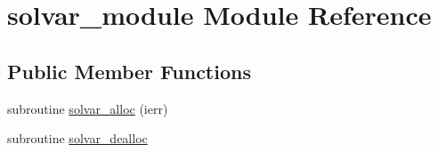 \hypertarget{classsolvar__module}{\section{solvar\-\_\-module Module Reference}
\label{classsolvar__module}
}
\subsection*{Public Member Functions}
\begin{DoxyCompactItemize}
\item 
subroutine \hyperlink{classsolvar__module_ac08a83960ee881de58d34efb24831a6c}{solvar\-\_\-alloc} (ierr)
\item 
subroutine \hyperlink{classsolvar__module_a82566cdad67c6fc8e9bc443020b1a825}{solvar\-\_\-dealloc}
\end{DoxyCompactItemize}
